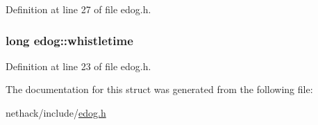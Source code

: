 Definition at line 27 of file edog.\+h.

\hypertarget{structedog_a5c6ebe338ea4ab9c7cdf06b34de4bbf6}{
\subsubsection[{whistletime}]{\setlength{\rightskip}{0pt plus 5cm}long edog\+::whistletime}}\label{structedog_a5c6ebe338ea4ab9c7cdf06b34de4bbf6}


Definition at line 23 of file edog.\+h.



The documentation for this struct was generated from the following file\+:\begin{DoxyCompactItemize}
\item 
nethack/include/\hyperlink{edog_8h}{edog.\+h}\end{DoxyCompactItemize}
